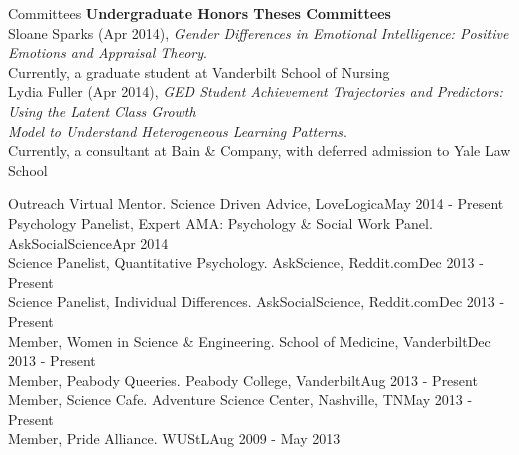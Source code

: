 \documentclass {resume}
\begin{document}
\begin{rSection}{\textrm{Committees}}
{\large \textbf{Undergraduate Honors Theses Committees}}\\
Sloane Sparks (Apr 2014), \textit{Gender Differences in Emotional Intelligence: Positive Emotions and Appraisal Theory}.\\
\hspace* {6 mm}Currently, a graduate student at Vanderbilt School of Nursing\smallskip\\%
Lydia Fuller (Apr 2014), \textit{GED Student Achievement Trajectories and Predictors: Using the Latent Class Growth\\
\hspace* {6 mm}Model to Understand Heterogeneous Learning Patterns}.\\
\hspace* {6 mm}Currently, a consultant at Bain \& Company, with deferred admission to Yale Law School
\end{rSection}%
\begin{rSection}{\textrm{Outreach}}
Virtual Mentor. Science Driven Advice, LoveLogica\hfill  {May 2014 - Present}\smallskip\\
Psychology Panelist, Expert AMA: Psychology \& Social Work Panel. AskSocialScience\hfill  {Apr 2014}\smallskip\\
Science Panelist, Quantitative Psychology. AskScience, Reddit.com\hfill  {Dec 2013 - Present}\smallskip\\%
Science Panelist, Individual Differences. AskSocialScience, Reddit.com\hfill  {Dec 2013 - Present}\smallskip\\
Member, Women in Science \& Engineering. School of Medicine, Vanderbilt\hfill  {Dec 2013 - Present}\smallskip\\%
Member, Peabody Queeries. Peabody College, Vanderbilt\hfill  {Aug 2013 - Present}\smallskip\\
Member, Science Cafe. Adventure Science Center, Nashville, TN\hfill  {May 2013 - Present}\smallskip\\
Member, Pride Alliance. WUStL\hfill  {Aug 2009 - May 2013}
\end{rSection}
\end{document}
